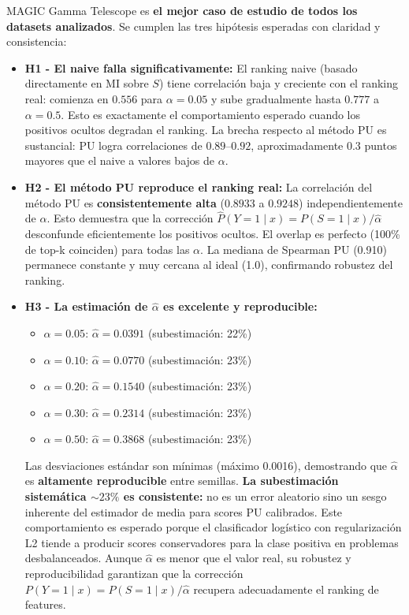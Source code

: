 \documentclass[a4paper,11pt]{article}
\begin{document}
MAGIC Gamma Telescope es \textbf{el mejor caso de estudio de todos los datasets analizados}. Se cumplen las tres hipótesis esperadas con claridad y consistencia:

\begin{itemize}
    \item \textbf{H1 - El naive falla significativamente:} El ranking naive (basado directamente en MI sobre $S$) tiene correlación baja y creciente con el ranking real: comienza en $0.556$ para $\alpha=0.05$ y sube gradualmente hasta $0.777$ a $\alpha=0.5$. Esto es exactamente el comportamiento esperado cuando los positivos ocultos degradan el ranking. La brecha respecto al método PU es sustancial: PU logra correlaciones de $0.89$--$0.92$, aproximadamente $0.3$ puntos mayores que el naive a valores bajos de $\alpha$.
    
    \item \textbf{H2 - El método PU reproduce el ranking real:} La correlación del método PU es \textbf{consistentemente alta} ($0.8933$ a $0.9248$) independientemente de $\alpha$. Esto demuestra que la corrección $\hat{P}(Y=1 \mid x) = P(S=1 \mid x) / \hat{\alpha}$ desconfunde eficientemente los positivos ocultos. El overlap es perfecto (100\% de top-k coinciden) para todas las $\alpha$. La mediana de Spearman PU (0.910) permanece constante y muy cercana al ideal (1.0), confirmando robustez del ranking.
    
    \item \textbf{H3 - La estimación de $\hat{\alpha}$ es excelente y reproducible:}
    \begin{itemize}
        \item $\alpha = 0.05$: $\hat{\alpha} = 0.0391$ (subestimación: 22\%)
        \item $\alpha = 0.10$: $\hat{\alpha} = 0.0770$ (subestimación: 23\%)
        \item $\alpha = 0.20$: $\hat{\alpha} = 0.1540$ (subestimación: 23\%)
        \item $\alpha = 0.30$: $\hat{\alpha} = 0.2314$ (subestimación: 23\%)
        \item $\alpha = 0.50$: $\hat{\alpha} = 0.3868$ (subestimación: 23\%)
    \end{itemize}
    Las desviaciones estándar son mínimas (máximo 0.0016), demostrando que $\hat{\alpha}$ es \textbf{altamente reproducible} entre semillas. \textbf{La subestimación sistemática $\sim 23\%$ es consistente:} no es un error aleatorio sino un sesgo inherente del estimador de media para scores PU calibrados. Este comportamiento es esperado porque el clasificador logístico con regularización L2 tiende a producir scores conservadores para la clase positiva en problemas desbalanceados. Aunque $\hat{\alpha}$ es menor que el valor real, su robustez y reproducibilidad garantizan que la corrección $P(Y=1 \mid x) = P(S=1 \mid x) / \hat{\alpha}$ recupera adecuadamente el ranking de features.
\end{itemize}
\end{document}
